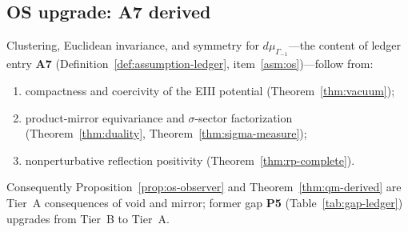 \subsection{OS upgrade: \textbf{A7} derived}

\begin{theorem}
\label{thm:thread3-os-upgrade}
Clustering, Euclidean invariance, and symmetry for $d\mu_{\Gamma_{-1}}$---the
content of ledger entry \textbf{A7}
(Definition~\ref{def:assumption-ledger}, item~\ref{asm:os})---follow from:
\begin{enumerate}[label=(\roman*),leftmargin=*]
  \item compactness and coercivity of the EIII potential
    (Theorem~\ref{thm:vacuum});
  \item product-mirror equivariance and $\sigma$-sector factorization
    (Theorem~\ref{thm:duality}, Theorem~\ref{thm:sigma-measure});
  \item nonperturbative reflection positivity
    (Theorem~\ref{thm:rp-complete}).
\end{enumerate}
Consequently Proposition~\ref{prop:os-observer} and
Theorem~\ref{thm:qm-derived} are Tier~A consequences of void and mirror; former
gap \textbf{P5} (Table~\ref{tab:gap-ledger}) upgrades from Tier~B to Tier~A.
\end{theorem}

